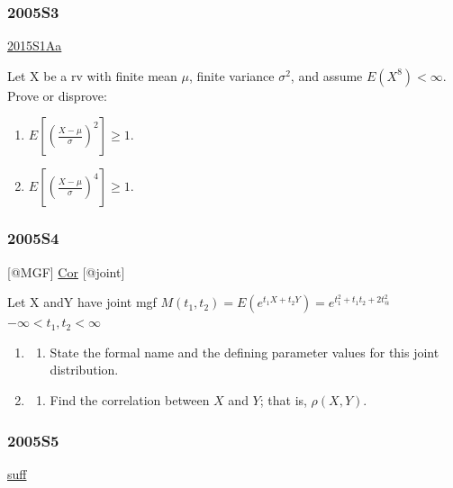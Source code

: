 \documentclass[10pt,twocolumn,portrait]{article}
\providecommand{\tightlist}{%
  \setlength{\itemsep}{0pt}\setlength{\parskip}{0pt}}
\begin{document}
\hypertarget{s3-1}{%
\subsubsection{2005S3}\label{s3-1}}

\protect\hyperlink{s1aa}{2015S1Aa}

Let X be a rv with finite mean \(\mu\), finite variance \(\sigma^2\),
and assume \(E(X^8)<\infty\). Prove or disprove:

\begin{enumerate}
\def\labelenumi{(\alph{enumi})}
\item
  \(E[(\frac{X-\mu}{\sigma})^2]\ge1\).
\item
  \(E[(\frac{X-\mu}{\sigma})^4]\ge1\).
\end{enumerate}

\hypertarget{s4-1}{%
\subsubsection{2005S4}\label{s4-1}}

{[}@MGF{]} \protect\hyperlink{Cor}{Cor} {[}@joint{]}

Let X andY have joint mgf
\(M(t_1,t_2)=E(e^{t_1X + t_2Y})=e^{t_1^2+t_1t_2+2t_@^2}\)
\(-\infty<t_1,t_2<\infty\)

\begin{enumerate}
\def\labelenumi{(\alph{enumi})}
\item
  \begin{enumerate}
  \def\labelenumii{(\arabic{enumii})}
  \setcounter{enumii}{9}
  \tightlist
  \item
    State the formal name and the defining parameter values for this
    joint distribution.
  \end{enumerate}
\item
  \begin{enumerate}
  \def\labelenumii{(\arabic{enumii})}
  \setcounter{enumii}{4}
  \tightlist
  \item
    Find the correlation between \(X\) and \(Y\); that is,
    \(\rho(X, Y)\).
  \end{enumerate}
\end{enumerate}

\hypertarget{s5-1}{%
\subsubsection{2005S5}\label{s5-1}}

\protect\hyperlink{section-6}{suff}
\end{document}
